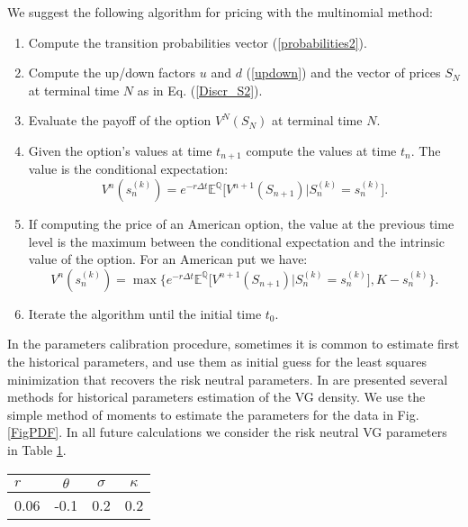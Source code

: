 \documentclass[]{interact}
\newcommand{\numberset}{\mathbb}
\newcommand{\E}{\numberset{E}}
\newcommand{\Q}{\numberset{Q}}
\theoremstyle{plain}%
\theoremstyle{definition}
\theoremstyle{remark}
\begin{document}
We suggest the following algorithm for pricing with the multinomial method:
\begin{enumerate}
 \item Compute the transition probabilities vector (\ref{probabilities2}). 
 \item Compute the up/down factors $u$ and $d$ (\ref{updown}) and the vector of prices $S_N$ at terminal time $N$ as in Eq. (\ref{Discr_S2}).
 \item Evaluate the payoff of the option $V^N(S_N)$ at terminal time $N$.
 \item Given the option's values at time $t_{n+1}$ compute the values at time $t_n$. The value is the conditional expectation:
 \begin{equation}
 V^n(s^{(k)}_n) = e^{-r\Delta t} \E^{\Q} \biggl[ V^{n+1}(S_{n+1}) \bigg| S^{(k)}_n = s^{(k)}_n \biggr]. 
\end{equation}
 \item If computing the price of an American option, the value at the previous time level is the maximum between the conditional expectation and
 the intrinsic value of the option. For an American put we have:
 \begin{equation}
 V^n(s^{(k)}_n) = \max \biggr \{ e^{-r\Delta t} \E^{\Q} \biggl[ V^{n+1}(S_{n+1}) \bigg| S^{(k)}_n = s^{(k)}_n \biggr] , K-s^{(k)}_n \biggr \}. 
\end{equation}	
 \item Iterate the algorithm until the initial time $t_0$. 
\end{enumerate}
In the parameters calibration procedure, sometimes it is common to estimate first the historical parameters, and use them as initial guess for the
least squares minimization that recovers the risk neutral parameters.
In \cite{Se04} are presented several methods for historical parameters estimation of the VG density. We use the simple method of moments to estimate the 
parameters for the data in Fig. \ref{FigPDF}.
In all future calculations we consider the risk neutral VG parameters in Table \ref{sample-table}.

\begin{table}[!h]
{\begin{tabular}{lccc} \toprule
$r$ & $\theta$ & $\sigma$ & $\kappa$ \\ \midrule
0.06 & -0.1 & 0.2 & 0.2 \\ \bottomrule
\end{tabular}}
\label{sample-table}
\end{table}
\end{document}

